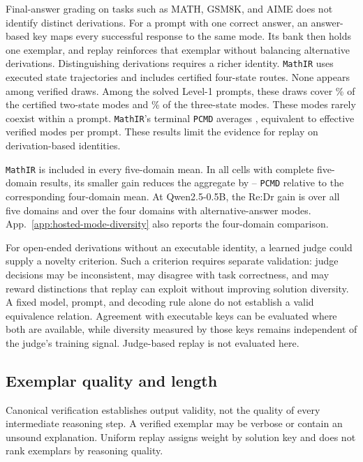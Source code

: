 \documentclass{article}
\newcommand{\1}{\mathbf 1}
\newcommand{\pmd}{\texttt{PCMD}}
\theoremstyle{remark}
\theoremstyle{definition}
\theoremstyle{plain}
\begin{document}
Final-answer grading on tasks such as MATH, GSM8K, and AIME does not identify
distinct derivations. For a prompt with one correct answer, an answer-based
key maps every successful response to the same mode. Its bank then holds
one exemplar, and replay reinforces that exemplar without balancing
alternative derivations. Distinguishing derivations requires a richer
identity. \texttt{MathIR} uses executed state trajectories and includes certified
four-state routes. None appears among \MIRdraws{} verified draws. Among the
\MIRsolvedprompts{} solved Level-1 prompts, these draws cover
\MIRcovershort{}\% of the certified two-state modes and \MIRcovermid{}\%
of the three-state modes. These modes rarely coexist within a prompt.
\texttt{MathIR}'s terminal \pmd{} averages \MIRpmdafter{}, equivalent to
\MIRneffafter{} effective verified modes per prompt. These results limit the
evidence for replay on derivation-based identities.

\texttt{MathIR} is included in every five-domain mean. In all \MIRshiftcells{} cells
with complete five-domain results, its smaller gain reduces the aggregate
by \MIRshiftmin{}--\MIRshiftmax{} \pmd{} relative to the corresponding
four-domain mean. At Qwen2.5-0.5B, the Re:Dr gain is \MIRfive{} over all five
domains and \MIRfour{} over the four domains with alternative-answer modes.
App.~\ref{app:hosted-mode-diversity} also reports the four-domain comparison.

For open-ended derivations without an executable identity, a learned judge
could supply a novelty criterion. Such a criterion requires separate
validation: judge decisions may be inconsistent, may disagree with task
correctness, and may reward distinctions that replay can exploit without
improving solution diversity. A fixed model, prompt, and decoding rule alone
do not establish a valid equivalence relation. Agreement with executable
keys can be evaluated where both are available, while diversity measured by
those keys remains independent of the judge's training signal. Judge-based
replay is not evaluated here.

\subsection{Exemplar quality and length}
\label{app:algorithm-quality}

Canonical verification establishes output validity, not the quality of every
intermediate reasoning step. A verified exemplar may be verbose or contain
an unsound explanation. Uniform replay assigns weight by solution key and
does not rank exemplars by reasoning quality.
\end{document}
